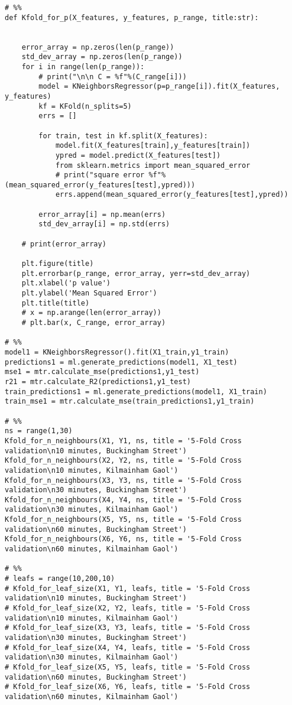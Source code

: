 \begin{verbatim}
# %%
def Kfold_for_p(X_features, y_features, p_range, title:str):


    error_array = np.zeros(len(p_range))
    std_dev_array = np.zeros(len(p_range))
    for i in range(len(p_range)):
        # print("\n\n C = %f"%(C_range[i]))
        model = KNeighborsRegressor(p=p_range[i]).fit(X_features, y_features)
        kf = KFold(n_splits=5)
        errs = []

        for train, test in kf.split(X_features):
            model.fit(X_features[train],y_features[train])
            ypred = model.predict(X_features[test])
            from sklearn.metrics import mean_squared_error
            # print("square error %f"%(mean_squared_error(y_features[test],ypred)))
            errs.append(mean_squared_error(y_features[test],ypred))
        
        error_array[i] = np.mean(errs)
        std_dev_array[i] = np.std(errs)

    # print(error_array)

    plt.figure(title)
    plt.errorbar(p_range, error_array, yerr=std_dev_array)
    plt.xlabel('p value')
    plt.ylabel('Mean Squared Error')
    plt.title(title)
    # x = np.arange(len(error_array))
    # plt.bar(x, C_range, error_array)

# %%
model1 = KNeighborsRegressor().fit(X1_train,y1_train)
predictions1 = ml.generate_predictions(model1, X1_test)
mse1 = mtr.calculate_mse(predictions1,y1_test)
r21 = mtr.calculate_R2(predictions1,y1_test)
train_predictions1 = ml.generate_predictions(model1, X1_train)
train_mse1 = mtr.calculate_mse(train_predictions1,y1_train)

# %%
ns = range(1,30)
Kfold_for_n_neighbours(X1, Y1, ns, title = '5-Fold Cross validation\n10 minutes, Buckingham Street')
Kfold_for_n_neighbours(X2, Y2, ns, title = '5-Fold Cross validation\n10 minutes, Kilmainham Gaol')
Kfold_for_n_neighbours(X3, Y3, ns, title = '5-Fold Cross validation\n30 minutes, Buckingham Street')
Kfold_for_n_neighbours(X4, Y4, ns, title = '5-Fold Cross validation\n30 minutes, Kilmainham Gaol')
Kfold_for_n_neighbours(X5, Y5, ns, title = '5-Fold Cross validation\n60 minutes, Buckingham Street')
Kfold_for_n_neighbours(X6, Y6, ns, title = '5-Fold Cross validation\n60 minutes, Kilmainham Gaol')

# %%
# leafs = range(10,200,10)
# Kfold_for_leaf_size(X1, Y1, leafs, title = '5-Fold Cross validation\n10 minutes, Buckingham Street')
# Kfold_for_leaf_size(X2, Y2, leafs, title = '5-Fold Cross validation\n10 minutes, Kilmainham Gaol')
# Kfold_for_leaf_size(X3, Y3, leafs, title = '5-Fold Cross validation\n30 minutes, Buckingham Street')
# Kfold_for_leaf_size(X4, Y4, leafs, title = '5-Fold Cross validation\n30 minutes, Kilmainham Gaol')
# Kfold_for_leaf_size(X5, Y5, leafs, title = '5-Fold Cross validation\n60 minutes, Buckingham Street')
# Kfold_for_leaf_size(X6, Y6, leafs, title = '5-Fold Cross validation\n60 minutes, Kilmainham Gaol')


\end{verbatim}
